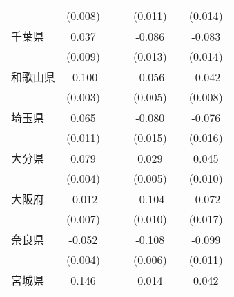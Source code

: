\begin{table}[htbp]
\begin{tabular}{l*{6}{c}}
                    &     (0.008)         &                     &                     &     (0.011)         &                     &     (0.014)         \\
千葉県              &       0.037\sym{***}&                     &                     &      -0.086\sym{***}&                     &      -0.083\sym{***}\\
                    &     (0.009)         &                     &                     &     (0.013)         &                     &     (0.014)         \\
和歌山県            &      -0.100\sym{***}&                     &                     &      -0.056\sym{***}&                     &      -0.042\sym{***}\\
                    &     (0.003)         &                     &                     &     (0.005)         &                     &     (0.008)         \\
埼玉県              &       0.065\sym{***}&                     &                     &      -0.080\sym{***}&                     &      -0.076\sym{***}\\
                    &     (0.011)         &                     &                     &     (0.015)         &                     &     (0.016)         \\
大分県              &       0.079\sym{***}&                     &                     &       0.029\sym{***}&                     &       0.045\sym{***}\\
                    &     (0.004)         &                     &                     &     (0.005)         &                     &     (0.010)         \\
大阪府              &      -0.012         &                     &                     &      -0.104\sym{***}&                     &      -0.072\sym{***}\\
                    &     (0.007)         &                     &                     &     (0.010)         &                     &     (0.017)         \\
奈良県              &      -0.052\sym{***}&                     &                     &      -0.108\sym{***}&                     &      -0.099\sym{***}\\
                    &     (0.004)         &                     &                     &     (0.006)         &                     &     (0.011)         \\
宮城県              &       0.146\sym{***}&                     &                     &       0.014         &                     &       0.042\sym{*}  \\

\end{tabular}
\end{table}
